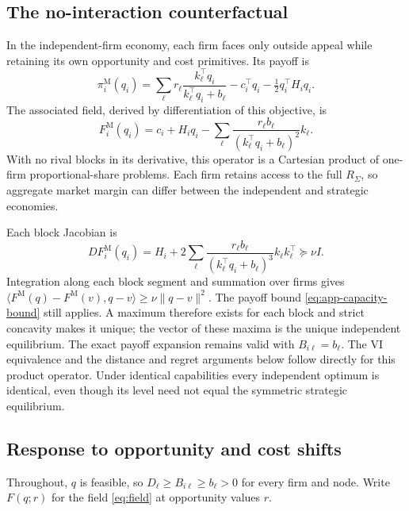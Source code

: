 \subsection{The no-interaction counterfactual}\label{app:independent-proof}

In the independent-firm economy, each firm faces only outside appeal while
retaining its own opportunity and cost primitives.
Its payoff is
\begin{equation}\label{eq:app-independent-payoff}
  \pi_i^{\mathrm M}(q_i)=\sum_\ell r_\ell\frac{k_\ell^\top
  q_i}{k_\ell^\top q_i+b_\ell}
  -c_i^\top q_i-\tfrac12q_i^\top H_i q_i.
\end{equation}
The associated field, derived by differentiation of this objective, is
\begin{equation}\label{eq:app-independent-field}
  F_i^{\mathrm M}(q_i)=c_i+H_i q_i-
  \sum_\ell\frac{r_\ell b_\ell}{(k_\ell^\top q_i+b_\ell)^2}k_\ell.
\end{equation}
With no rival blocks in its derivative, this operator is a Cartesian
product of one-firm proportional-share problems.
Each firm retains access to the full $R_\Sigma$, so aggregate market margin
can differ between the independent and strategic economies.

Each block Jacobian is
\begin{equation}\label{eq:app-independent-curvature}
  DF_i^{\mathrm M}(q_i)=H_i+
  2\sum_\ell\frac{r_\ell b_\ell}{(k_\ell^\top q_i+b_\ell)^3}k_\ell k_\ell^\top
  \succeq\nu I.
\end{equation}
Integration along each block segment and summation over firms gives
$\langle F^{\mathrm M}(q)-F^{\mathrm M}(v),q-v\rangle\geq\nu\|q-v\|^2$.
The payoff bound \eqref{eq:app-capacity-bound} still applies.
A maximum therefore exists for each block and strict concavity makes it unique;
the vector of these maxima is the unique independent equilibrium.
The exact payoff expansion remains valid with $B_{i\ell}=b_\ell$.
The VI equivalence and the distance and regret arguments below follow
directly for this product operator.
Under identical capabilities every independent optimum is identical,
even though its level need not equal
the symmetric strategic equilibrium.

\subsection{Response to opportunity and cost shifts}\label{app:response}

Throughout, $q$ is feasible, so $D_\ell\geq B_{i\ell}\geq b_\ell>0$ for every
firm and node.
Write $F(q;r)$ for the field \eqref{eq:field} at opportunity values $r$.

